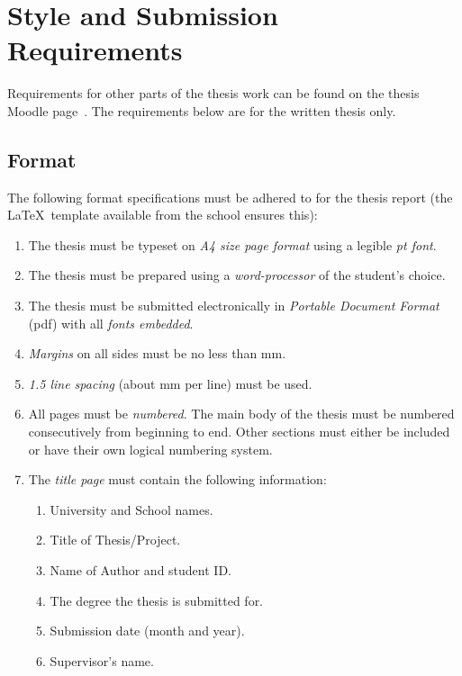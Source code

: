 \chapter{Style and Submission Requirements}\label{ch:style}

Requirements for other parts of the thesis work can be found on the thesis
Moodle page~\cite{Phu16}.  The requirements below are for the written thesis
only.

\section{Format}
The following format specifications must be adhered to for the thesis report
(the \LaTeX\ template available from the school ensures this):
\begin{enumerate}
\item The thesis must be typeset on \emph{A4 size page format} using a
legible \emph{\unit[12]{pt} font}.
\item The thesis must be prepared using a \emph{word-processor} of the
student's choice.
\item The thesis must be submitted electronically in
\emph{Portable Document Format} (pdf) with all \emph{fonts embedded}.
\item \emph{Margins} on all sides must be no less than \unit[25]{mm}.
\item \emph{1.5 line spacing} (about \unit[8]{mm} per line) must be used.
\item All pages must be \emph{numbered}. The main body of the thesis must be
numbered consecutively from beginning to end.  Other sections must either
be included or have their own logical numbering system.
\item The \emph{title page} must contain the following information:
\begin{enumerate}
\item University and School names.
\item Title of Thesis/Project.
\item Name of Author and student ID.
\item The degree the thesis is submitted for.
\item Submission date (month and year).
\item Supervisor's name.
\end{enumerate}
\end{enumerate}

